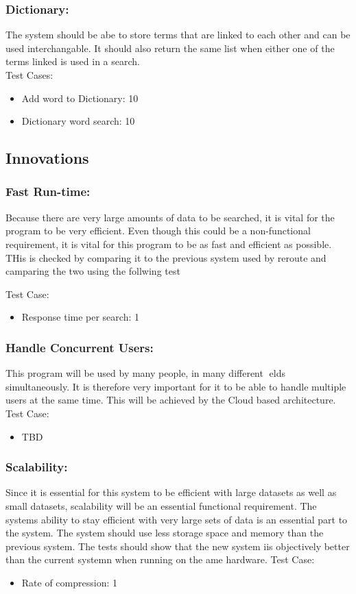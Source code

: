 \documentclass[11pt]{article}
\begin{document}
	\subsubsection{Dictionary: }
	The system should be abe to store terms that are linked to each other and can be used interchangable. It should also return the same list when either one of the terms linked is used in a search.\\
	Test Cases:
	 \begin{itemize}
	 \item Add word to Dictionary: 10
	 \item Dictionary word search: 10
        \end{itemize}
	
	\subsection{Innovations}
	\subsubsection{Fast Run-time:}
Because there are very large amounts of data to be searched, it is vital for the program to be very
efficient. Even though this could be a non-functional requirement, it is vital for this program to be as fast
and efficient as possible. THis is checked by comparing it to the previous system used by reroute and camparing the two using the follwing test

	Test Case:
	\begin{itemize}	
        \item Response time per search: 1 
         \end{itemize}

	\subsubsection{Handle Concurrent Users:}
This program will be used by many people, in many different elds simultaneously. It is therefore very important for it to be able to handle multiple users
at the same time. This will be achieved by the Cloud based architecture.	
	Test Case:
	\begin{itemize}
        	\item TBD 
       \end{itemize}

	\subsubsection{Scalability:}
	Since it is essential for this system to be efficient with large datasets as well as small datasets, scalability will be an essential functional requirement. The systems ability to stay efficient with very large sets of data is an essential part to the system. The system should use less storage space and memory than the previous system. The tests should show that the new system iis objectively better than the current systemn when running on the ame hardware.	
	Test Case:
	\begin{itemize}
      	  	\item Rate of compression: 1
        \end{itemize}
\end{document}
